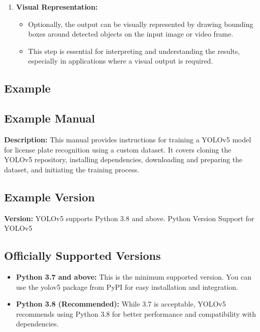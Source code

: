 \begin{enumerate}
\begin{itemize}
		\item Non-maximum suppression is a common technique used to remove redundant bounding boxes and keep only the most confident predictions.
	\end{itemize}
	\item \textbf{Visual Representation:}
	\begin{itemize}
		\item Optionally, the output can be visually represented by drawing bounding boxes around detected objects on the input image or video frame.
		\item This step is essential for interpreting and understanding the results, especially in applications where a visual output is required.
	\end{itemize}
\end{enumerate}


\subsection{Example}
\subsection{Example Manual}
\textbf{Description:} This manual provides instructions for training a YOLOv5 model for license plate recognition using a custom dataset. It covers cloning the YOLOv5 repository, installing dependencies, downloading and preparing the dataset, and initiating the training process.\newline
\subsection{Example Version}
\textbf{Version:} YOLOv5 supports Python 3.8 and above.\newline
Python Version Support for YOLOv5

\subsection*{Officially Supported Versions}
\begin{itemize}[label=--]
	\item \textbf{Python 3.7 and above:} This is the minimum supported version. You can use the yolov5 package from PyPI for easy installation and integration.
	\item \textbf{Python 3.8 (Recommended):} While 3.7 is acceptable, YOLOv5 recommends using Python 3.8 for better performance and compatibility with dependencies.
\end{itemize}

